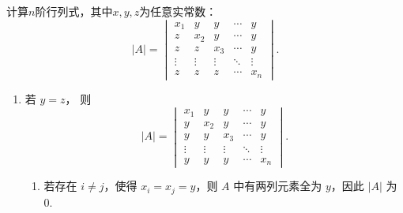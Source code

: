 \begin{exercise}
\begin{exgroup}
\begin{answer}
        \end{answer}

        \item 计算$n$阶行列式，其中$x,y,z$为任意实常数：
        \[|A|=\begin{vmatrix}
                x_1    & y      & y      & \cdots & y      \\
                z      & x_2    & y      & \cdots & y      \\
                z      & z      & x_3    & \cdots & y      \\
                \vdots & \vdots & \vdots & \ddots & \vdots \\
                z      & z      & z      & \cdots & x_n
            \end{vmatrix}.\]
        \begin{answer}
            \begin{enumerate}
                \item 若 $y = z$，
                    则
                    \[
                        |A| = \begin{vmatrix}
                            x_1    & y      & y      & \cdots & y      \\
                            y      & x_2    & y      & \cdots & y      \\
                            y      & y      & x_3    & \cdots & y      \\
                            \vdots & \vdots & \vdots & \ddots & \vdots \\
                            y      & y      & y      & \cdots & x_n
                        \end{vmatrix}.
                    \]

                    \begin{enumerate}
                        \item 若存在 $i \neq j$，使得 $x_i = x_j = y$，则 $A$ 中有两列元素全为 $y$，因此 $|A|$ 为 $0$.


\end{enumerate}
\end{enumerate}
\end{answer}
\end{exgroup}
\end{exercise}
